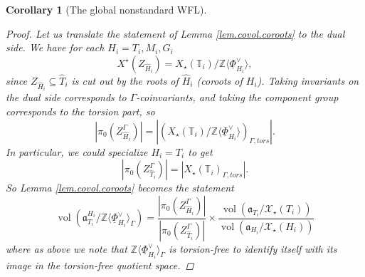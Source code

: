 \documentclass[openany]{amsbook}
\newtheorem{corollary}[theorem]{Corollary}
\theoremstyle{definition}
\theoremstyle{remark}
\numberwithin{equation}{section}
\newcommand{\Z}{\mathbb{Z}}
\newcommand{\T}{\mathbb{T}}
\newcommand{\cX}{\mathcal{X}}
\newcommand{\ul}[1]{\underline{#1}}
\newcommand{\vol}{\operatorname{vol}}
\renewcommand{\-}{\operatorname{-}}
\renewcommand{\a}{\mathfrak{a}}
\newcommand{\tors}{\mathit{tors}}
\begin{document}
\begin{corollary}[The global nonstandard WFL]
\begin{proof}
        Let us translate the statement of Lemma \ref{lem.covol.coroots} to the dual side. We have for each $H_i = T_i, M_i, G_i$
        $$
            X^\star(Z_{\widehat{H}_i}) = X_\star(\T_i)/\Z\langle \ul{\Phi}^\vee_{H_i} \rangle,
        $$
        since $Z_{\widehat{H}_i} \subseteq \widehat{T}_i$ is cut out by the roots of $\widehat{H}_i$ (coroots of $H_i$). Taking invariants on the dual side corresponds to $\Gamma$-coinvariants, and taking the component group corresponds to the torsion part, so
        $$
            |\pi_0(Z_{\widehat{H}_i}^{\Gamma})| = \left|(X_\star(\T_i)/\Z\langle \ul{\Phi}^\vee_{H_i} \rangle)_{\Gamma, \tors}\right|.
        $$
        In particular, we could specialize $H_i = T_i$ to get 
        $$
            |\pi_0(Z_{\widehat{T}_i}^{\Gamma})| = \left|X_\star(\T_i)_{\Gamma, \tors}\right|.
        $$
        So Lemma \ref{lem.covol.coroots} becomes the statement
        $$
            \vol(\a_{T_i}^{H_i}/\Z \langle \ul{\Phi}_{H_i}^\vee \rangle_\Gamma) = \frac{|\pi_0(Z_{\widehat{H}_i}^{\Gamma})|}{|\pi_0(Z_{\widehat{T}_i}^{\Gamma})|} \times \frac{\vol(\a_{T_i}/\cX_\star(T_i))}{\vol(\a_{H_i}/\cX_\star(H_i))}
        $$
        where as above we note that $\Z \langle \ul{\Phi}_{H_i}^\vee \rangle_\Gamma$ is torsion-free to identify itself with its image in the torsion-free quotient space.


\end{proof}
\end{corollary}
\end{document}
